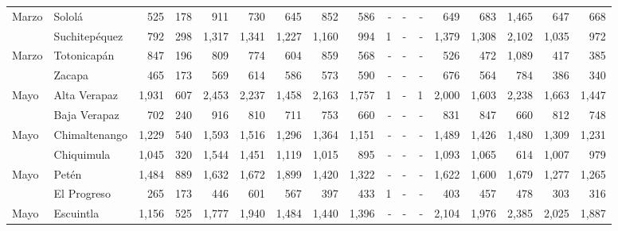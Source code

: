 \begin{landscape}
\begin{center}
\begin{longtable}{llrrrrrrrrrrrrrrr}
			\multicolumn{1}{l}{	\footnotesize	 Marzo 	}&	 Sololá 	&	 525 	&	 178 	&	 911 	&	 730 	&	 645 	&	 852 	&	 586 	&	 -   	&	 -   	&	 -   	&	 649 	&	 683 	&	 1,465 	&	 647 	&	 668 	\\
			\rowcolor{color1!5!white}\multicolumn{1}{l}{	\footnotesize	 Marzo 	}&	 Suchitepéquez 	&	 792 	&	 298 	&	 1,317 	&	 1,341 	&	 1,227 	&	 1,160 	&	 994 	&	 1 	&	 -   	&	 -   	&	 1,379 	&	 1,308 	&	 2,102 	&	 1,035 	&	 972 	\\
			\multicolumn{1}{l}{	\footnotesize	 Marzo 	}&	 Totonicapán 	&	 847 	&	 196 	&	 809 	&	 774 	&	 604 	&	 859 	&	 568 	&	 -   	&	 -   	&	 -   	&	 526 	&	 472 	&	 1,089 	&	 417 	&	 385 	\\
			\rowcolor{color1!5!white}\multicolumn{1}{l}{	\footnotesize	 Marzo 	}&	 Zacapa 	&	 465 	&	 173 	&	 569 	&	 614 	&	 586 	&	 573 	&	 590 	&	 -   	&	 -   	&	 -   	&	 676 	&	 564 	&	 784 	&	 386 	&	 340 	\\
			\multicolumn{1}{l}{	\footnotesize	 Mayo 	}&	 Alta Verapaz 	&	 1,931 	&	 607 	&	 2,453 	&	 2,237 	&	 1,458 	&	 2,163 	&	 1,757 	&	 1 	&	 -   	&	 1 	&	 2,000 	&	 1,603 	&	 2,238 	&	 1,663 	&	 1,447 	\\
			\rowcolor{color1!5!white}\multicolumn{1}{l}{	\footnotesize	 Mayo 	}&	 Baja Verapaz 	&	 702 	&	 240 	&	 916 	&	 810 	&	 711 	&	 753 	&	 660 	&	 -   	&	 -   	&	 -   	&	 831 	&	 847 	&	 660 	&	 812 	&	 748 	\\
			\multicolumn{1}{l}{	\footnotesize	 Mayo 	}&	 Chimaltenango 	&	 1,229 	&	 540 	&	 1,593 	&	 1,516 	&	 1,296 	&	 1,364 	&	 1,151 	&	 -   	&	 -   	&	 -   	&	 1,489 	&	 1,426 	&	 1,480 	&	 1,309 	&	 1,231 	\\
			\rowcolor{color1!5!white}\multicolumn{1}{l}{	\footnotesize	 Mayo 	}&	 Chiquimula 	&	 1,045 	&	 320 	&	 1,544 	&	 1,451 	&	 1,119 	&	 1,015 	&	 895 	&	 -   	&	 -   	&	 -   	&	 1,093 	&	 1,065 	&	 614 	&	 1,007 	&	 979 	\\
			\multicolumn{1}{l}{	\footnotesize	 Mayo 	}&	 Petén 	&	 1,484 	&	 889 	&	 1,632 	&	 1,672 	&	 1,899 	&	 1,420 	&	 1,322 	&	 -   	&	 -   	&	 -   	&	 1,622 	&	 1,600 	&	 1,679 	&	 1,277 	&	 1,265 	\\
			\rowcolor{color1!5!white}\multicolumn{1}{l}{	\footnotesize	 Mayo 	}&	 El Progreso 	&	 265 	&	 173 	&	 446 	&	 601 	&	 567 	&	 397 	&	 433 	&	 1 	&	 -   	&	 -   	&	 403 	&	 457 	&	 478 	&	 303 	&	 316 	\\
			\multicolumn{1}{l}{	\footnotesize	 Mayo 	}&	 Escuintla 	&	 1,156 	&	 525 	&	 1,777 	&	 1,940 	&	 1,484 	&	 1,440 	&	 1,396 	&	 -   	&	 -   	&	 -   	&	 2,104 	&	 1,976 	&	 2,385 	&	 2,025 	&	 1,887 	\\

\end{longtable}
\end{center}
\end{landscape}
